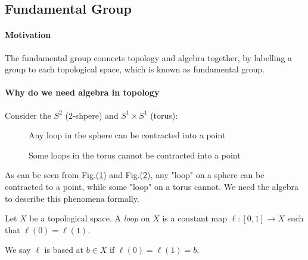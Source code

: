 \subsection{Fundamental Group}
\paragraph{Motivation}
The fundamental group connects topology and algebra together, by labelling a group to each topological space, which is known as fundamental group.
\paragraph{Why do we need algebra in topology}
Consider the $S^2$ (2-shpere) and $S^1\times S^1$ (torus):
\begin{figure}[H]
	\caption{Any loop in the sphere can be contracted into a point}
	\label{Fig:11:8:a}
\end{figure}
\begin{figure}[H]
	\caption{Some loops in the torus cannot be contracted into a point}
	\label{Fig:11:9:a}
\end{figure}
As can be seen from Fig.(\ref{Fig:11:8:a}) and Fig.(\ref{Fig:11:9:a}), any "loop" on a sphere can be contracted to a point, while some "loop" on a torus cannot. 
We need the algebra to describe this phenomena formally. 

\begin{definition}[loop]
Let $X$ be a topological space.
A \emph{loop} on $X$ is a constant map $\ell:[0,1]\to X$ such that $\ell(0) = \ell(1)$.

We say $\ell$ is based at $b\in X$ if $\ell(0)=\ell(1)=b$.
\end{definition}

